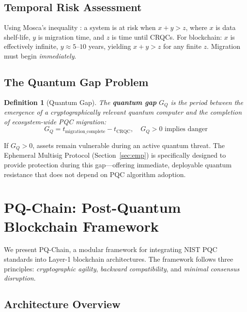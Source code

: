 \documentclass[12pt, a4paper, twocolumn]{article}
\newtheorem{definition}{Definition}
\begin{document}
\subsection{Temporal Risk Assessment}

Using Mosca's inequality \cite{mosca2018cybersecurity}: a system is at risk when $x + y > z$, where $x$ is data shelf-life, $y$ is migration time, and $z$ is time until CRQCs. For blockchain: $x$ is effectively infinite, $y \approx 5\text{--}10$ years, yielding $x + y > z$ for any finite $z$. Migration must begin \emph{immediately}.

\subsection{The Quantum Gap Problem}

\begin{definition}[Quantum Gap]
\label{def:qgap}
The \textbf{quantum gap} $G_Q$ is the period between the emergence of a cryptographically relevant quantum computer and the completion of ecosystem-wide PQC migration:
\[
G_Q = t_{\text{migration\_complete}} - t_{\text{CRQC}}, \quad G_Q > 0 \text{ implies danger}
\]
\end{definition}

If $G_Q > 0$, assets remain vulnerable during an active quantum threat. The Ephemeral Multisig Protocol (Section~\ref{sec:emp}) is specifically designed to provide protection during this gap---offering immediate, deployable quantum resistance that does not depend on PQC algorithm adoption.

\section{PQ-Chain: Post-Quantum Blockchain Framework}
\label{sec:framework}

We present PQ-Chain, a modular framework for integrating NIST PQC standards into Layer-1 blockchain architectures. The framework follows three principles: \emph{cryptographic agility}, \emph{backward compatibility}, and \emph{minimal consensus disruption}.

\subsection{Architecture Overview}
\end{document}

